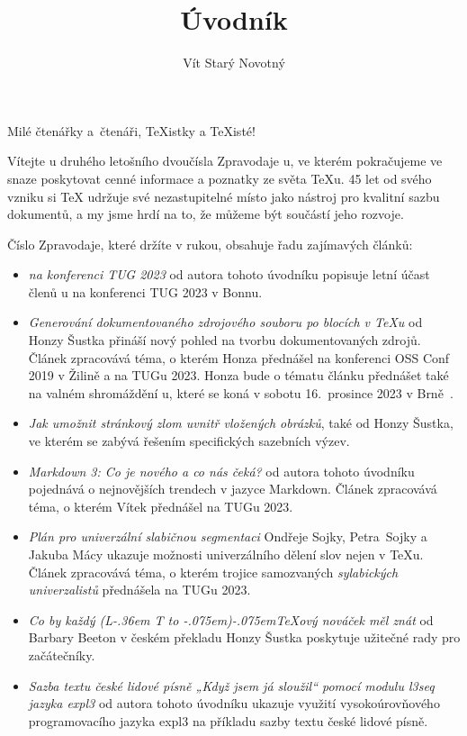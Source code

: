 \documentclass{csbulletin}
\makeatletter
\DeclareRobustCommand{\La}{L\kern-.36em%
        {\sbox\z@ T%
         \vbox to\ht\z@{\hbox{\check@mathfonts
                              \fontsize\sf@size\z@
                              \math@fontsfalse\selectfont
                              A}%
                        \vss}%
        }}
\def\AllTeX{(\La\kern-.075em)\kern-.075em\TeX}
\makeatother
\begin{document}
\title{Úvodník}
\author{Vít Starý Novotný}
\maketitle

Milé čtenářky a~čtenáři, \TeX istky a \TeX isté!

\medskip

Vítejte u druhého letošního dvoučísla Zpravodaje \CSTUG u, ve kterém pokračujeme ve snaze poskytovat cenné informace a poznatky ze světa \TeX u. 45 let od svého vzniku si \TeX{} udržuje své nezastupitelné místo jako nástroj pro kvalitní sazbu dokumentů, a my jsme hrdí na to, že můžeme být součástí jeho rozvoje.

Číslo Zpravodaje, které držíte v rukou, obsahuje řadu zajímavých článků:

\begin{itemize}
  \item \emph{\CSTUG{} na konferenci TUG 2023} od autora tohoto úvodníku popisuje letní účast členů \CSTUG u na konferenci TUG 2023 v Bonnu.
  \item \emph{Generování dokumentovaného zdrojového souboru po blocích v \TeX u} od Honzy Šustka přináší nový pohled na tvorbu dokumentovaných zdrojů. Článek zpracovává téma, o kterém Honza přednášel na konferenci OSS Conf 2019 v Žilině a na TUGu 2023. Honza bude o tématu článku přednášet také na valném shromáždění \CSTUG u, které se koná v sobotu 16.~prosince 2023 v Brně~\cite{starynovotny2023valna}.
  \item \emph{Jak umožnit stránkový zlom uvnitř vložených obrázků}, také od Honzy Šustka, ve kterém se zabývá řešením specifických sazebních výzev.
  \item \emph{Markdown 3: Co je nového a co nás čeká?} od autora tohoto úvodníku pojednává o nejnovějších trendech v jazyce Markdown. Článek zpracovává téma, o kterém Vítek přednášel na TUGu 2023.
  \item \emph{Plán pro univerzální slabičnou segmentaci} Ondřeje Sojky, Petra~Sojky a Jakuba Mácy ukazuje možnosti univerzálního dělení slov nejen v \TeX u. Článek zpracovává téma, o kterém trojice samozvaných \emph{sylabických univerzalistů} přednášela na TUGu 2023.
  \item \emph{Co by každý \AllTeX ový nováček měl znát} od Barbary Beeton v českém překladu Honzy Šustka poskytuje užitečné rady pro začátečníky.
  \item \emph{Sazba textu české lidové písně „Když jsem já
sloužil“ pomocí modulu l3seq jazyka expl3} od autora tohoto úvodníku ukazuje využití vysokoúrovňového programovacího jazyka expl3 na příkladu sazby textu české lidové písně.
\end{itemize}
\end{document}
